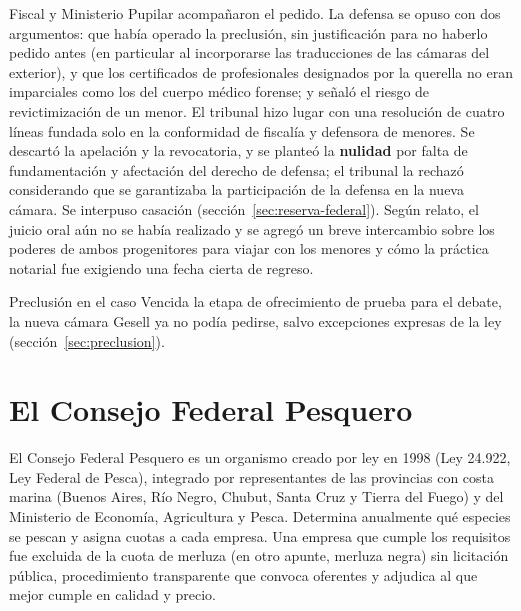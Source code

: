 \documentclass[12pt,oneside]{book}
\begin{document}
Fiscal y Ministerio Pupilar acompañaron el pedido. La defensa se opuso con dos argumentos: que había operado la preclusión, sin justificación para no haberlo pedido antes (en particular al incorporarse las traducciones de las cámaras del exterior), y que los certificados de profesionales designados por la querella no eran imparciales como los del cuerpo médico forense; y señaló el riesgo de revictimización de un menor. El tribunal hizo lugar con una resolución de cuatro líneas fundada solo en la conformidad de fiscalía y defensora de menores. Se descartó la apelación y la revocatoria, y se planteó la \textbf{nulidad} por falta de fundamentación y afectación del derecho de defensa; el tribunal la rechazó considerando que se garantizaba la participación de la defensa en la nueva cámara. Se interpuso casación (sección~\ref{sec:reserva-federal}). Según relato, el juicio oral aún no se había realizado y se agregó un breve intercambio sobre los poderes de ambos progenitores para viajar con los menores y cómo la práctica notarial fue exigiendo una fecha cierta de regreso.

\begin{definicion}{Preclusión en el caso}
Vencida la etapa de ofrecimiento de prueba para el debate, la nueva cámara Gesell ya no podía pedirse, salvo excepciones expresas de la ley (sección~\ref{sec:preclusion}).
\end{definicion}

\section{El Consejo Federal Pesquero}\label{sec:pesquero}

El Consejo Federal Pesquero es un organismo creado por ley en 1998 (Ley 24.922, Ley Federal de Pesca), integrado por representantes de las provincias con costa marina (Buenos Aires, Río Negro, Chubut, Santa Cruz y Tierra del Fuego) y del Ministerio de Economía, Agricultura y Pesca. Determina anualmente qué especies se pescan y asigna cuotas a cada empresa. Una empresa que cumple los requisitos fue excluida de la cuota de merluza (en otro apunte, merluza negra) sin licitación pública, procedimiento transparente que convoca oferentes y adjudica al que mejor cumple en calidad y precio.
\end{document}
